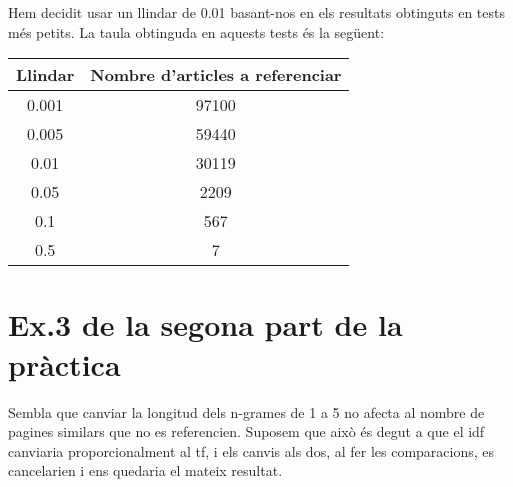 \documentclass[11pt,a4paper,twoside]{report}
\begin{document}
Hem decidit usar un llindar de 0.01 basant-nos en els resultats obtinguts en tests més petits. La taula obtinguda en aquests tests és la següent:

\begin{tabular}{|c|c|}
\hline
\rowcolor[HTML]{ECF4FF}
\textbf{Llindar}            & \textbf{Nombre d'articles a referenciar} \\ \hline
\multicolumn{1}{|c|}{0.001} & \multicolumn{1}{c|}{97100}               \\ \hline
\multicolumn{1}{|c|}{0.005} & \multicolumn{1}{c|}{59440}               \\ \hline
\multicolumn{1}{|c|}{0.01}  & \multicolumn{1}{c|}{30119}               \\ \hline
\multicolumn{1}{|c|}{0.05}  & \multicolumn{1}{c|}{2209}                \\ \hline
\multicolumn{1}{|c|}{0.1}   & \multicolumn{1}{c|}{567}                 \\ \hline
\multicolumn{1}{|c|}{0.5}   & \multicolumn{1}{c|}{7}                   \\ \hline
\end{tabular}

\section{Ex.3 de la segona part de la pràctica}

Sembla que canviar la longitud dels n-grames de 1 a 5 no afecta al nombre de pagines similars que no es referencien. Suposem que això és degut a que el idf canviaria proporcionalment al tf, i els canvis als dos, al fer les comparacions, es cancelarien i ens quedaria el mateix resultat.
\end{document}
